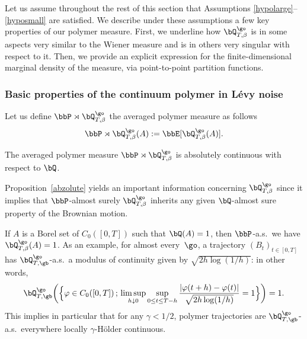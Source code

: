 \label{sec:mainprop}

Let us assume throughout the rest of this section that Assumptions \eqref{hypolarge}--\eqref{hyposmall} are satisfied.
We describe under these assumptions a few key properties of our polymer measure. First, we underline how $\bQ^{\go}_{T,\beta}$ is in some aspects very similar to the Wiener measure and is in others very singular with respect to it.
Then, we provide an explicit expression for the finite-dimensional marginal density of the measure, via point-to-point partition functions.

\subsubsection{Basic properties of the continuum polymer in Lévy noise}
\label{bazics}

Let us define $\bbP\rtimes\bQ^{\go}_{T,\beta}$ the averaged polymer measure as follows
\begin{equation}
\bbP\rtimes\bQ^{\go}_{T,\beta}(A):= \bbE[\bQ^{\go}_{T,\beta}(A) ].
\end{equation}

\begin{proposition} \label{abzolute}
The averaged polymer measure
$\bbP\rtimes \bQ^{\go}_{T,\beta}$ is absolutely continuous with respect to $\bQ$.
\end{proposition}

 Proposition~\ref{abzolute} yields an important information concerning $\bQ^{\go}_{T,\beta}$ since it implies that $\bbP$-almost surely $ \bQ^{\go}_{T,\beta}$ inherits any given $\bQ$-almost sure property of the Brownian motion.

\begin{cor}
If $A$ is a Borel set of $C_0([0,T])$ such that $\bQ(A)=1$, then $\bbP$-a.s.\ we have $ \bQ^{\go}_{T,\beta}(A)=1$.
As an example,
for almost every~$\go$, a trajectory $(B_t)_{t\in [0,T]}$
has $\bQ_{T,\gb}^{\go}$-a.s.\ a modulus of continuity
given by $\sqrt{2h \log(1/h)}$: in other words,
\[
\bQ_{T,\gb}^{\go} \bigg(\Bigl\{ \varphi \in C_0([0,T]) \,; \, \limsup_{h\downarrow 0} \sup_{ 0\leq t \leq T-h} \frac{|\varphi(t+h) - \varphi(t)|}{ \sqrt{2h \log(1/h)}} =1 \Bigr\} \bigg) =1.
\]
This implies in particular that for any $\gamma<1/2$,
polymer trajectories are $\bQ_{T,\gb}^{\go}$-a.s.\ everywhere locally $\gamma$-Hölder continuous.
\end{cor}

